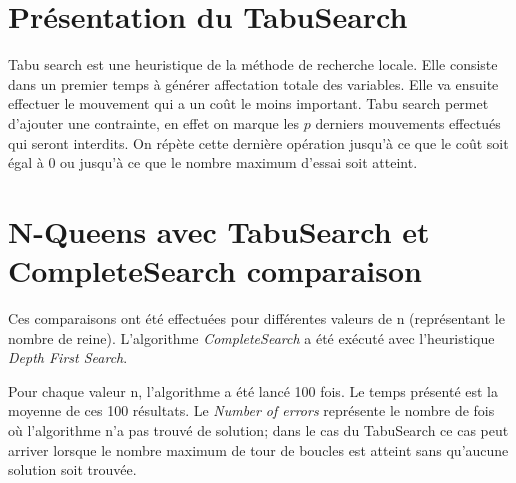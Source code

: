 \documentclass[a4paper,10pt]{article}
\begin{document}
\section{Présentation du TabuSearch}
Tabu search est une heuristique de la méthode de recherche locale. Elle consiste dans un premier temps à générer affectation totale des variables. Elle va ensuite effectuer le mouvement qui a un coût le moins important. Tabu search permet d'ajouter une contrainte, en effet on marque les $p$ derniers mouvements effectués qui seront interdits. On répète cette dernière opération jusqu'à ce que le coût soit égal à 0 ou jusqu'à ce que le nombre maximum d'essai soit atteint.

\section{N-Queens avec TabuSearch et CompleteSearch comparaison}

Ces comparaisons ont été effectuées pour différentes valeurs de n (représentant le nombre de reine). L'algorithme \emph{CompleteSearch} a été exécuté avec l'heuristique \emph{Depth First Search}.

Pour chaque valeur n, l'algorithme a été lancé 100 fois. Le temps présenté est la moyenne de ces 100 résultats. Le \emph{Number of errors} représente le nombre de fois où l'algorithme n'a pas trouvé de solution; dans le cas du TabuSearch ce cas peut arriver lorsque le nombre maximum de tour de boucles est atteint sans qu'aucune solution soit trouvée. \newline
\end{document}
